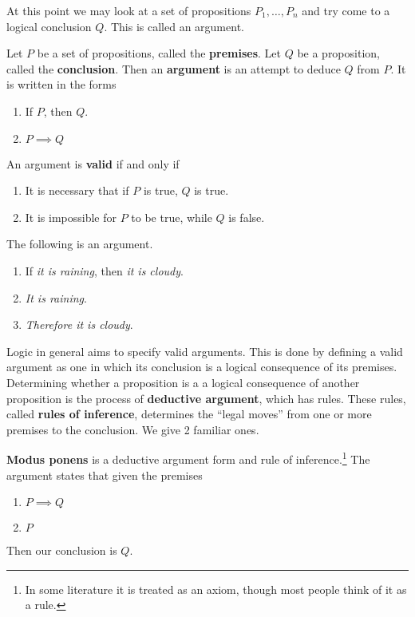   At this point we may look at a set of propositions $P_1, \ldots, P_n$ and try come to a logical conclusion $Q$. This is called an argument. 

  \begin{definition}[Argument]
    Let $P$ be a set of propositions, called the \textbf{premises}. Let $Q$ be a proposition, called the \textbf{conclusion}. Then an \textbf{argument} is an attempt to deduce $Q$ from $P$. It is written in the forms 
    \begin{enumerate}
      \item If $P$, then $Q$.  
      \item $P \implies Q$
    \end{enumerate}
    An argument is \textbf{valid} if and only if  
    \begin{enumerate}
      \item It is necessary that if $P$ is true, $Q$ is true. 
      \item It is impossible for $P$ to be true, while $Q$ is false. 
    \end{enumerate}
  \end{definition}

  \begin{example}
    The following is an argument. 
    \begin{enumerate}
      \item If \textit{it is raining}, then \textit{it is cloudy}. 
      \item \textit{It is raining}. 
      \item \textit{Therefore it is cloudy}.
    \end{enumerate}
  \end{example} 

  Logic in general aims to specify valid arguments. This is done by defining a valid argument as one in which its conclusion is a logical consequence of its premises. Determining whether a proposition is a a logical consequence of another proposition is the process of \textbf{deductive argument}, which has rules. These rules, called \textbf{rules of inference}, determines the ``legal moves'' from one or more premises to the conclusion. We give 2 familiar ones. 

  \begin{definition}
    \textbf{Modus ponens} is a deductive argument form and rule of inference.\footnote{In some literature it is treated as an axiom, though most people think of it as a rule.} The argument states that given the premises
    \begin{enumerate}
      \item $P \implies Q$ 
      \item $P$
    \end{enumerate}
    Then our conclusion is $Q$. 
  \end{definition} 

